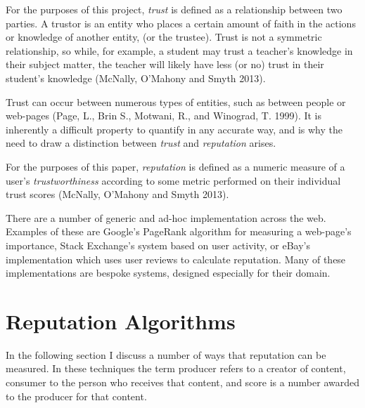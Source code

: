 \documentclass[]{final_report}
\begin{document}
For the purposes of this project, \textsl{trust} is defined as a relationship between two parties. A trustor is an entity who places a certain amount of faith in the actions or knowledge of another entity, (or the trustee). Trust is not a symmetric relationship, so while, for example, a student may trust a teacher's knowledge in their subject matter, the teacher will likely have less (or no) trust in their student's knowledge  (McNally, O'Mahony and Smyth 2013).

Trust can occur between numerous types of entities, such as between people or web-pages (Page, L., Brin S., Motwani, R., and Winograd, T. 1999). It is inherently a difficult property to quantify in any accurate way, and is why the need to draw a distinction between \textsl{trust} and \textsl{reputation} arises.

For the purposes of this paper, \textsl{reputation} is defined as a numeric measure of a user's \textsl{trustworthiness} according to some metric performed on their individual trust scores (McNally, O'Mahony and Smyth 2013).

There are a number of generic and ad-hoc implementation across the web. Examples of these are Google's PageRank algorithm for measuring a web-page's importance, Stack Exchange's system based on user activity, or eBay's implementation which uses user reviews to calculate reputation. Many of these implementations are bespoke systems, designed especially for their domain.


\section{Reputation Algorithms}
In the following section I discuss a number of ways that reputation can be measured. In these techniques the term producer refers to a creator of content, consumer to the person who receives that content, and score is a number awarded to the producer for that content.

\end{document}
